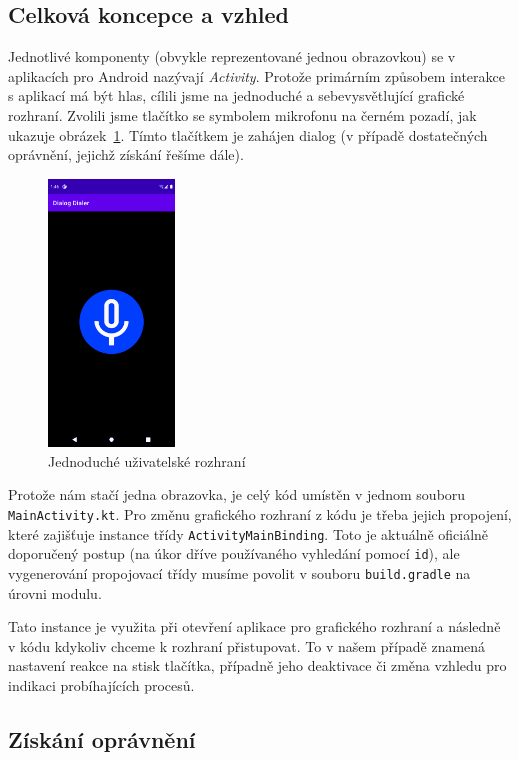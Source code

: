 \subsection{Celková koncepce a vzhled}

Jednotlivé komponenty (obvykle reprezentované jednou obrazovkou)
se v aplikacích
pro Android nazývají \textit{Activity}. Protože primárním způsobem interakce
s aplikací má být hlas, cílili jsme na jednoduché a sebevysvětlující grafické
rozhraní. Zvolili jsme tlačítko se symbolem mikrofonu na černém pozadí,
jak ukazuje obrázek~\ref{ui}. Tímto tlačítkem je zahájen dialog (v případě
dostatečných oprávnění, jejichž získání řešíme dále).

\begin{figure}[h]\label{ui}
    \centering
    \includegraphics[width=0.3\textwidth]{../img/ui.pdf}
    \caption{Jednoduché uživatelské rozhraní}
\end{figure}

Protože nám stačí jedna obrazovka, je celý kód umístěn v jednom souboru
\texttt{MainActivity.kt}. Pro změnu grafického rozhraní z kódu je třeba
jejich propojení, které zajišťuje instance třídy \texttt{ActivityMainBinding}.
Toto je aktuálně oficiálně doporučený postup (na úkor dříve používaného
vyhledání pomocí \texttt{id}), ale vygenerování propojovací třídy musíme
povolit v souboru \texttt{build.gradle} na úrovni modulu.

Tato instance je využita při otevření aplikace pro  grafického
rozhraní a následně v kódu kdykoliv chceme k rozhraní přistupovat. To v našem
případě znamená nastavení reakce na stisk tlačítka, případně jeho deaktivace
či změna vzhledu pro indikaci probíhajících procesů.

\subsection{Získání oprávnění}

